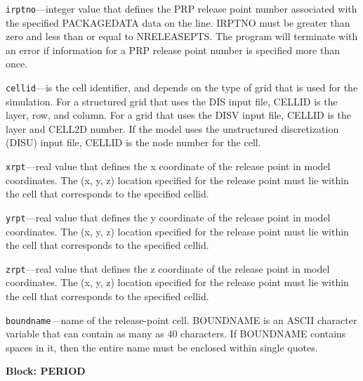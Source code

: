 \begin{description}
\item \texttt{irptno}---integer value that defines the PRP release point number associated with the specified PACKAGEDATA data on the line. IRPTNO must be greater than zero and less than or equal to NRELEASEPTS.  The program will terminate with an error if information for a PRP release point number is specified more than once.

\item \texttt{cellid}---is the cell identifier, and depends on the type of grid that is used for the simulation.  For a structured grid that uses the DIS input file, CELLID is the layer, row, and column.   For a grid that uses the DISV input file, CELLID is the layer and CELL2D number.  If the model uses the unstructured discretization (DISU) input file, CELLID is the node number for the cell.

\item \texttt{xrpt}---real value that defines the x coordinate of the release point in model coordinates.  The (x, y, z) location specified for the release point must lie within the cell that corresponds to the specified cellid.

\item \texttt{yrpt}---real value that defines the y coordinate of the release point in model coordinates.  The (x, y, z) location specified for the release point must lie within the cell that corresponds to the specified cellid.

\item \texttt{zrpt}---real value that defines the z coordinate of the release point in model coordinates.  The (x, y, z) location specified for the release point must lie within the cell that corresponds to the specified cellid.

\item \texttt{boundname}---name of the release-point cell.  BOUNDNAME is an ASCII character variable that can contain as many as 40 characters.  If BOUNDNAME contains spaces in it, then the entire name must be enclosed within single quotes.

\end{description}
\item \textbf{Block: PERIOD}


